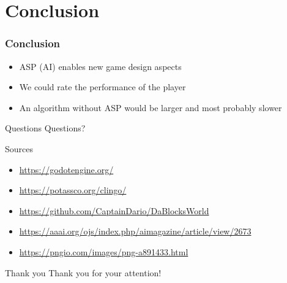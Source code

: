 \documentclass[12pt]{beamer}
\begin{document}
    \section{Conclusion}
        \begin{frame}[fragile]
            \frametitle{Conclusion}
            \begin{itemize}
                \item ASP (AI) enables new game design aspects
                \item We could rate the performance of the player
                \item An algorithm without ASP would be larger
                      and most probably slower
            \end{itemize}
        \end{frame}

    \begin{frame}[fragile]{Questions}
        Questions?  
    \end{frame}

    \begin{frame}[fragile]{Sources}
        \begin{itemize}
            \item \url{https://godotengine.org/}
            \item \url{https://potassco.org/clingo/}
            \item \url{https://github.com/CaptainDario/DaBlocksWorld}
            \item \url{https://aaai.org/ojs/index.php/aimagazine/article/view/2673}
            \item \url{https://pngio.com/images/png-a891433.html}
        \end{itemize}
    \end{frame}

    \begin{frame}[fragile]{Thank you}
       Thank you for your attention!
    \end{frame}
\end{document}
